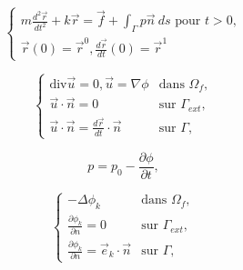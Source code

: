 \documentclass[10pt,a4paper,oneside]{article}
\begin{document}
\[ \begin{cases}
m \frac{d^2\vec{r}}{dt^2} + k\vec{r} = \vec{f} + \int_{\Gamma} p\vec{n}\ ds \text{ pour } t > 0,\\
\vec{r}(0) = \vec{r}^0, \frac{d\vec{r}}{dt}(0) = \vec{r}^1
\end{cases} \label{eq:position} \tag{2} \]

\[ \begin{cases}
\text{div} \vec{u} = 0, \vec{u} = \nabla \phi & \text{dans } \Omega_f,\\
\vec{u} \cdot \vec{n} = 0 & \text{sur } \Gamma_{ext},\\
\vec{u} \cdot \vec{n} = \frac{d\vec{r}}{dt} \cdot \vec{n} & \text{sur } \Gamma,
\end{cases} \label{eq:potentiel} \tag{3} \]

\[ p = p_0 - \frac{\partial \phi}{\partial t} , \]

\[ \begin{cases}
-\Delta \phi_k & \text{dans } \Omega_f,\\
\frac{\partial \phi_k}{\partial n} = 0 & \text{sur } \Gamma_{ext},\\
\frac{\partial \phi_k}{\partial n} = \vec{e}_k \cdot \vec{n} & \text{sur } \Gamma,
\end{cases} \label{eq:auxiliare} \tag{4} \]
\end{document}
